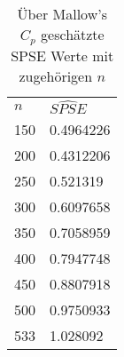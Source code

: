 \begin{table}[!h]
    \centering
	\begin{tabular}{|l|l|}
		\cline{1-2}
		$n$   & $\hat{SPSE}$ \\ 		\cline{1-2}
		150 &  0.4964226   \\ \cline{1-2}
		200 &  0.4312206   \\ \cline{1-2}
		250 &  0.521319    \\ \cline{1-2}
		300 &  0.6097658  \\ \cline{1-2}
		350 &  0.7058959   \\ \cline{1-2}
		400 &  0.7947748 \\ \cline{1-2}
		450 &  0.8807918  \\ \cline{1-2}
		500 &  0.9750933   \\ \cline{1-2}
		533 &  1.028092   \\ \cline{1-2}

	\end{tabular}
	\caption{Über Mallow's $C_p$ geschätzte SPSE Werte mit zugehörigen $n$}
\end{table}